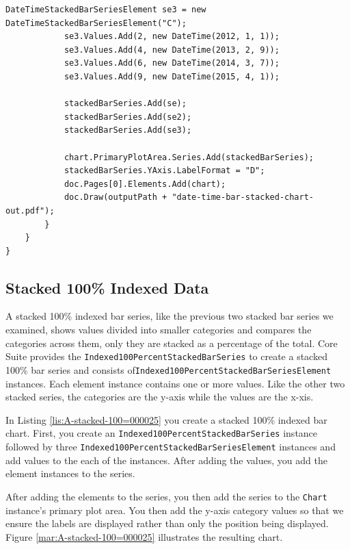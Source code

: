 \documentclass[american]{tufte-book}
\numberwithin{equation}{section}
\numberwithin{figure}{section}
\begin{document}
{\begin{lstlisting}[caption={A date/time stacked bar chart.},label={lis:A-date/time-stacked},basicstyle={\footnotesize\ttfamily},breaklines=true]
            DateTimeStackedBarSeriesElement se3 = new DateTimeStackedBarSeriesElement("C");
            se3.Values.Add(2, new DateTime(2012, 1, 1));
            se3.Values.Add(4, new DateTime(2013, 2, 9));
            se3.Values.Add(6, new DateTime(2014, 3, 7));
            se3.Values.Add(9, new DateTime(2015, 4, 1));

            stackedBarSeries.Add(se);
            stackedBarSeries.Add(se2);
            stackedBarSeries.Add(se3);
                        
            chart.PrimaryPlotArea.Series.Add(stackedBarSeries);
            stackedBarSeries.YAxis.LabelFormat = "D";
            doc.Pages[0].Elements.Add(chart);
            doc.Draw(outputPath + "date-time-bar-stacked-chart-out.pdf");
        }
    }
}
\end{lstlisting}
\leavevmode\egroup

\subsection{Stacked 100\% Indexed Data}

A stacked 100\% indexed bar series, like the previous two stacked
bar series we examined, shows values divided into smaller categories
and compares the categories across them, only they are stacked as
a percentage of the total. Core Suite provides the \texttt{Indexed100PercentStackedBarSeries}
to create a stacked 100\% bar series and consists of\linebreak \texttt{Indexed100PercentStackedBarSeriesElement} instances.
Each element instance contains one or more values. Like the other
two stacked series, the categories are the y-axis while the values
are the x-xis.

In Listing \ref{lis:A-stacked-100=000025} you create a stacked 100\%
indexed bar chart. First, you create an \texttt{Indexed100PercentStackedBarSeries}
instance followed by three \texttt{Indexed100PercentStackedBarSeriesElement}
instances and add values to the each of the instances. After adding
the values, you add the element instances to the series.

After adding the elements to the series, you then add the series to
the \texttt{Chart} instance's primary plot area. You then add the y-axis
category values so that we ensure the labels are displayed rather
than only the position being displayed. Figure \ref{mar:A-stacked-100=000025}
illustrates the resulting chart.

}
\end{document}
